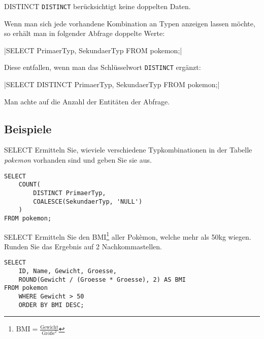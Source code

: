 \begin{bonus}{DISTINCT}
    \texttt{DISTINCT} berücksichtigt keine doppelten Daten.

    Wenn man sich jede vorhandene Kombination an Typen anzeigen lassen möchte, so erhält man in folgender Abfrage doppelte Werte:

    |SELECT PrimaerTyp, SekundaerTyp FROM pokemon;|

    

    Diese entfallen, wenn man das Schlüsselwort \texttt{DISTINCT} ergänzt:

    |SELECT DISTINCT PrimaerTyp, SekundaerTyp FROM pokemon;|

    
    
    Man achte auf die Anzahl der Entitäten der Abfrage.
\end{bonus}

\subsection{Beispiele}

\begin{example}{SELECT}
    Ermitteln Sie, wieviele verschiedene Typkombinationen in der Tabelle \emph{pokemon} vorhanden sind und geben Sie sie aus.

    \exampleseparator

    \begin{verbatim}
SELECT
    COUNT(
        DISTINCT PrimaerTyp,
        COALESCE(SekundaerTyp, 'NULL')
    )
FROM pokemon;
    \end{verbatim}

    
\end{example}

\begin{example}{SELECT}
    Ermitteln Sie den BMI\footnote{$\text{BMI} = \frac{\text{Gewicht}}{\text{Größe}^2}$} aller Pokèmon, welche mehr als 50kg wiegen.
    Runden Sie das Ergebnis auf 2 Nachkommastellen.

    \exampleseparator

    \begin{verbatim}
SELECT
    ID, Name, Gewicht, Groesse,
    ROUND(Gewicht / (Groesse * Groesse), 2) AS BMI
FROM pokemon
    WHERE Gewicht > 50
    ORDER BY BMI DESC;
    \end{verbatim}

    
\end{example}

